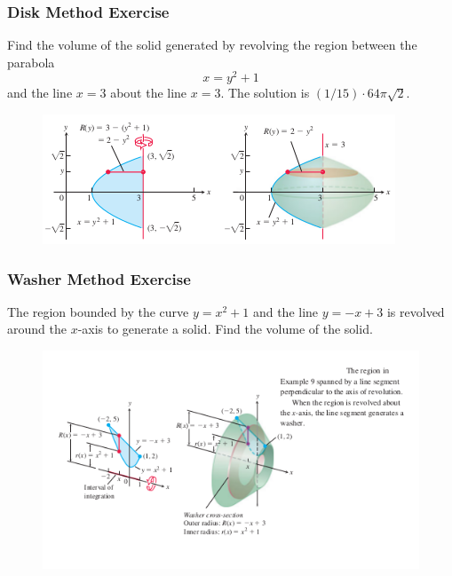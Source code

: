 \documentclass[xcolor=dvipsnames]{beamer}
\begin{document}
\begin{frame}
  \frametitle{Disk Method Exercise}
{\ubung} Find the volume of the solid generated by revolving the
region between the parabola 
\begin{equation}
  \label{eq:ebaikeiw}
  x=y^{2}+1
\end{equation}
and the line $x=3$ about the line $x=3$. The solution is $(1/15)\cdot{}64\pi\sqrt{2}$.
\begin{figure}[h]
  \includegraphics[scale=0.7]{./diagrams/revthr.png}
\end{figure}
\end{frame}

\begin{frame}
  \frametitle{Washer Method Exercise}
{\ubung} The region bounded by the curve $y=x^{2}+1$ and the line
$y=-x+3$ is revolved around the $x$-axis to generate a solid. Find the
volume of the solid.
\begin{figure}[h]
  \includegraphics[scale=0.65]{./diagrams/washer.png}
\end{figure}
\end{frame}
\end{document}

